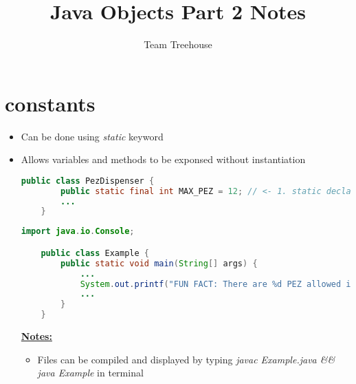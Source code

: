 \documentclass[12pt]{article}
\begin{document}
\title{Java Objects Part 2 Notes}
\author{Team Treehouse}
\maketitle

\bigskip

\section{constants}

\bigskip

\begin{itemize}
    \item Can be done using \textit{static} keyword
    \item Allows variables and methods to be exponsed without instantiation

    \begin{lstlisting}[language=Java,caption={lesson\_1/PezDispenser.java}]
    public class PezDispenser {
        public static final int MAX_PEZ = 12; // <- 1. static declared here :)
        ...
    }
    \end{lstlisting}

    \begin{lstlisting}[language=Java,caption={lesson\_1/Example.java}]
    import java.io.Console;

    public class Example {
        public static void main(String[] args) {
            ...
            System.out.printf("FUN FACT: There are %d PEZ allowed in every dispenser\n", PezDispenser.MAX_PEZ); // 2. <- And is used here :)
            ...
        }
    }
    \end{lstlisting}

    \bigskip

    \underline{\textbf{Notes:}}

    \bigskip

    \begin{itemize}
        \item Files can be compiled and displayed by typing \textit{javac Example.java \&\& java Example}
        in terminal
    \end{itemize}
\end{itemize}
\end{document}
